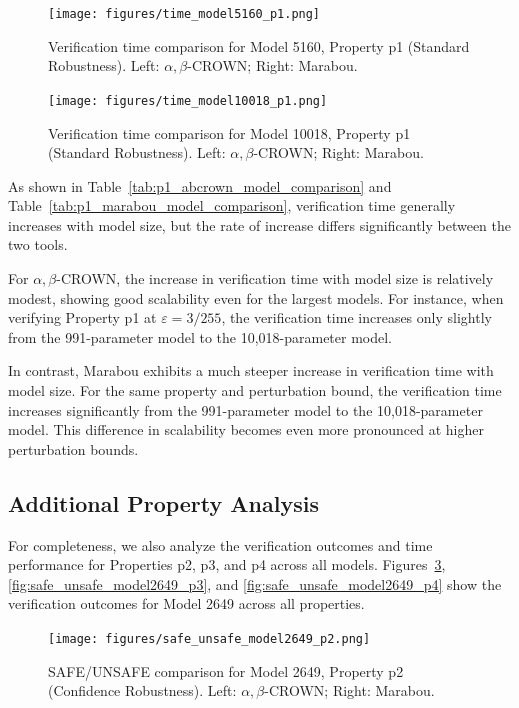\begin{figure}[htbp]
    \centering
    \texttt{[image: figures/time\_model5160\_p1.png]}
    \caption{Verification time comparison for Model 5160, Property p1 (Standard Robustness). Left: $\alpha, \beta$-CROWN; Right: Marabou.}
    \label{fig:time_model5160_p1}
\end{figure}

\begin{figure}[htbp]
    \centering
    \texttt{[image: figures/time\_model10018\_p1.png]}
    \caption{Verification time comparison for Model 10018, Property p1 (Standard Robustness). Left: $\alpha, \beta$-CROWN; Right: Marabou.}
    \label{fig:time_model10018_p1}
\end{figure}

As shown in Table~\ref{tab:p1_abcrown_model_comparison} and Table~\ref{tab:p1_marabou_model_comparison}, verification time generally increases with model size, but the rate of increase differs significantly between the two tools.




For $\alpha, \beta$-CROWN, the increase in verification time with model size is relatively modest, showing good scalability even for the largest models. For instance, when verifying Property p1 at $\varepsilon = 3/255$, the verification time increases only slightly from the 991-parameter model to the 10,018-parameter model.

In contrast, Marabou exhibits a much steeper increase in verification time with model size. For the same property and perturbation bound, the verification time increases significantly from the 991-parameter model to the 10,018-parameter model. This difference in scalability becomes even more pronounced at higher perturbation bounds.

\subsection{Additional Property Analysis}

For completeness, we also analyze the verification outcomes and time performance for Properties p2, p3, and p4 across all models. Figures~\ref{fig:safe_unsafe_model2649_p2}, \ref{fig:safe_unsafe_model2649_p3}, and \ref{fig:safe_unsafe_model2649_p4} show the verification outcomes for Model 2649 across all properties.

\begin{figure}[htbp]
    \centering
    \texttt{[image: figures/safe\_unsafe\_model2649\_p2.png]}
    \caption{SAFE/UNSAFE comparison for Model 2649, Property p2 (Confidence Robustness). Left: $\alpha, \beta$-CROWN; Right: Marabou.}
    \label{fig:safe_unsafe_model2649_p2}
\end{figure}

